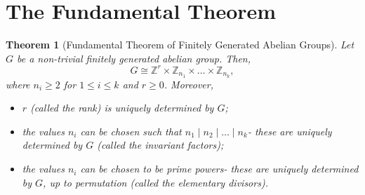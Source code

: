 \documentclass[a4paper, openany]{memoir}
\theoremstyle{definition}
\theoremstyle{plain}
\newtheorem{theorem}[definition]{Theorem}
\begin{document}
    \newpage

    \section{The Fundamental Theorem}
    \begin{theorem}[Fundamental Theorem of Finitely Generated Abelian Groups]
        Let $G$ be a non-trivial finitely generated abelian group. Then, 
        \[G \cong \mathbb{Z}^r \times \mathbb{Z}_{n_1} \times \dots \times \mathbb{Z}_{n_k},\]
        where $n_i \geq 2$ for $1 \leq i \leq k$ and $r \geq 0$. Moreover,
        \begin{itemize}
            \item $r$ (called the \emph{rank}) is uniquely determined by $G$;
            \item the values $n_i$ can be chosen such that $n_1 \mid n_2 \mid \dots \mid n_k$- these are uniquely determined by $G$ (called the \emph{invariant factors});
            \item the values $n_i$ can be chosen to be prime powers- these are uniquely determined by $G$, up to permutation (called the \emph{elementary divisors}).
        \end{itemize}
    \end{theorem}
\end{document}
